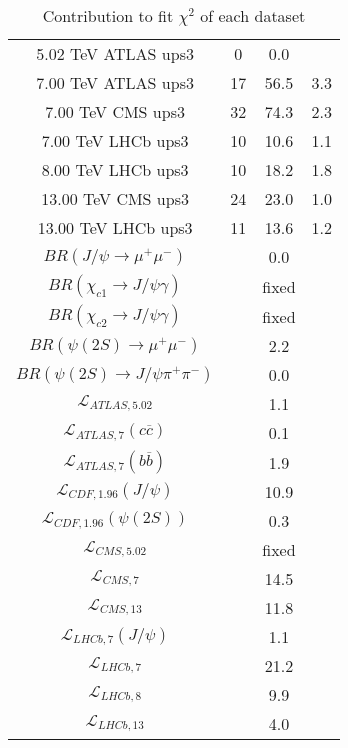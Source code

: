 \begin{table}[h!]
\begin{tabular}{c|c|c|c}
5.02 TeV ATLAS ups3 & 0 & 0.0 &  \\
7.00 TeV ATLAS ups3 & 17 & 56.5 & 3.3 \\
7.00 TeV CMS ups3 & 32 & 74.3 & 2.3 \\
7.00 TeV LHCb ups3 & 10 & 10.6 & 1.1 \\
8.00 TeV LHCb ups3 & 10 & 18.2 & 1.8 \\
13.00 TeV CMS ups3 & 24 & 23.0 & 1.0 \\
13.00 TeV LHCb ups3 & 11 & 13.6 & 1.2 \\
\hline
$BR(J/\psi\rightarrow\mu^+\mu^-)$ &  & 0.0 &  \\
$BR(\chi_{c1}\rightarrow J/\psi\gamma)$ &  & fixed & \\
$BR(\chi_{c2}\rightarrow J/\psi\gamma)$ &  & fixed & \\
$BR(\psi(2S)\rightarrow\mu^+\mu^-)$ &  & 2.2 &  \\
$BR(\psi(2S)\rightarrow J/\psi\pi^+\pi^-)$ &  & 0.0 &  \\
$\mathcal L_{ATLAS,5.02}$ &  & 1.1 &  \\
$\mathcal L_{ATLAS,7}(c\overline c)$ &  & 0.1 &  \\
$\mathcal L_{ATLAS,7}(b\overline b)$ &  & 1.9 &  \\
$\mathcal L_{CDF,1.96}(J/\psi)$ &  & 10.9 &  \\
$\mathcal L_{CDF,1.96}(\psi(2S))$ &  & 0.3 &  \\
$\mathcal L_{CMS,5.02}$ &  & fixed & \\
$\mathcal L_{CMS,7}$ &  & 14.5 &  \\
$\mathcal L_{CMS,13}$ &  & 11.8 &  \\
$\mathcal L_{LHCb,7}(J/\psi)$ &  & 1.1 &  \\
$\mathcal L_{LHCb,7}$ &  & 21.2 &  \\
$\mathcal L_{LHCb,8}$ &  & 9.9 &  \\
$\mathcal L_{LHCb,13}$ &  & 4.0 &  \\
\end{tabular}
\caption{Contribution to fit $\chi^2$ of each dataset}
\end{table}
